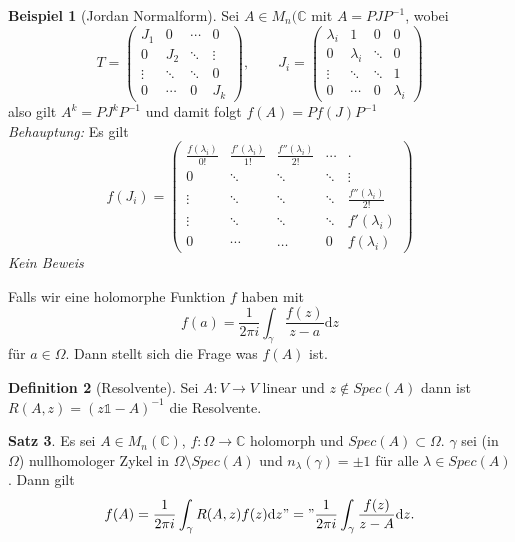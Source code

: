 \documentclass[11pt,titlepage]{article}
\theoremstyle{definition}
\newtheorem{theorem}{Satz}[section]
\newtheorem{definition}[theorem]{Definition}
\newtheorem{example}[theorem]{Beispiel}
\theoremstyle{remark}
\begin{document}
	\begin{example}[Jordan Normalform]
		Sei $A\in M_n(\mathbb{C}$ mit $A=PJP^{-1}$, wobei
		\[ T= \begin{pmatrix} J_1 & 0 & \cdots & 0 \\
						0 & J_2 & \ddots & \vdots \\
						\vdots & \ddots & \ddots & 0 \\
						0 & \cdots & 0 & J_k
			\end{pmatrix}, \qquad
		J_i= \begin{pmatrix} \lambda_i & 1 & 0 & 0 \\
						0 & \lambda_i & \ddots & 0 \\
						\vdots & \ddots & \ddots & 1 \\
						0 & \cdots & 0 & \lambda_i
			\end{pmatrix} \]
		also gilt $A^k=PJ^kP^{-1}$ und damit folgt $f(A)=Pf(J)P^{-1}$ \\
		\textsl{Behauptung:} Es gilt
		\[ f(J_i)= \begin{pmatrix} \frac{f(\lambda_i)}{0!} & \frac{f'(\lambda_i)}{1!} 
							& \frac{f''(\lambda_i)}{2!} & \cdots & \cdot \\
						     0 & \ddots & \ddots & \ddots & \vdots \\
						     \vdots & \ddots & \ddots & \ddots & \frac{f''(\lambda_i)}{2!} \\
						     \vdots & \ddots & \ddots & \ddots & f'(\lambda_i) \\
						     0 & \cdots & \dots & 0 & f(\lambda_i)
				\end{pmatrix} \]
		\textsl{Kein Beweis}
	\end{example}
	
	Falls wir eine holomorphe Funktion $f$ haben mit 
	\[ f(a) = \frac{1}{2\pi i} \int_{\gamma} \frac{f(z)}{z-a}\mathrm{d}z \]
	für $a\in\Omega$. Dann stellt sich die Frage was $f(A)$ ist.
	
	\begin{definition}[Resolvente]
		Sei $A:V\to V$ linear und $z\notin Spec(A)$ dann ist $ R(A,z)=(z\mathds{1}-A)^{-1}$ die Resolvente.
	\end{definition}
	
	\begin{theorem}
		Es sei $A\in M_n(\mathbb{C})$, $f:\Omega\to\mathbb{C}$ holomorph und $Spec(A)\subset\Omega$.
		$\gamma$ sei (in $\Omega$) nullhomologer Zykel in $\Omega\setminus Spec(A)$ und 
		$n_{\lambda}(\gamma)=\pm 1$ für alle $\lambda\in Spec(A)$. Dann gilt
		\[ f(A)=\frac{1}{2\pi i}\int_{\gamma} R(A,z)f(z)\mathrm{d}z \text{$"="$} \frac{1}{2\pi i}
		\int_{\gamma} \frac{f(z)}{z-A}\mathrm{d}z. \]
	\end{theorem}
	
\end{document}
